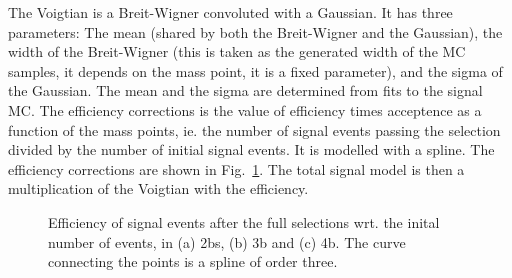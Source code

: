 The Voigtian is a Breit-Wigner convoluted with a Gaussian. It has three parameters: The mean (shared by both the Breit-Wigner and the Gaussian), the width of the Breit-Wigner (this is taken as the generated width of the MC samples, it depends on the mass point, it is a fixed parameter), and the sigma of the Gaussian. The mean and the sigma are determined from fits to the signal MC.
The efficiency corrections is the value of efficiency times acceptence as a function of the mass points, ie. the number of signal events passing the selection divided by the number of initial signal events. It is modelled with a spline. The efficiency corrections are shown in Fig.~\ref{fig:directfit:efficiencies}.
The total signal model is then a multiplication of the Voigtian with the efficiency.

\begin{figure}[htbp!]
\begin{center}
\caption{Efficiency of signal events after the full selections wrt. the inital number of events, in (a) 2bs, (b) 3b and (c) 4b. The curve connecting the points is a spline of order three.}
\label{fig:directfit:efficiencies}
\end{center}
\end{figure}

